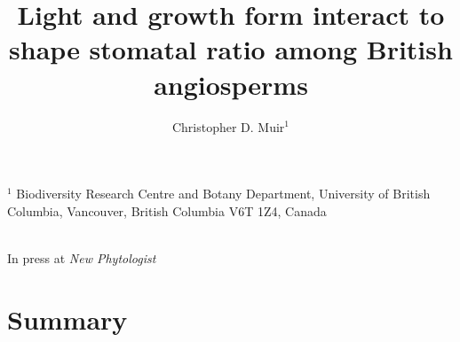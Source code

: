 \documentclass[12pt, oneside]{article}
\newcommand{\stretchy}{1.5}
\begin{document}


\title{Light and growth form interact to shape stomatal ratio among British angiosperms}
\author{Christopher D. Muir$^1$}
\date{} %

\maketitle

$^1$ Biodiversity Research Centre and Botany Department, University of British Columbia, Vancouver, British Columbia V6T 1Z4, Canada \\
\\
\begin{center}
In press at \textit{New Phytologist} \\
\end{center}
\clearpage




\section*{Summary}
\end{document}
